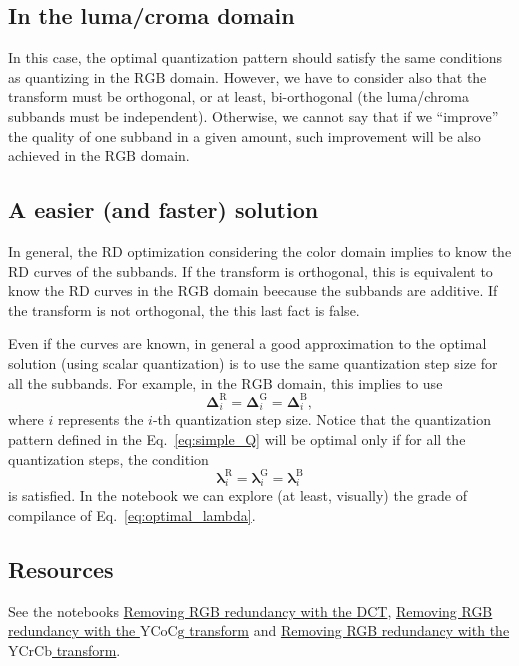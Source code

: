 \subsection{In the luma/croma domain}

In this case, the optimal quantization pattern should satisfy the same
conditions as quantizing in the $\text{RGB}$ domain. However, we have
to consider also that the transform must be orthogonal, or at least,
bi-orthogonal (the luma/chroma subbands must be
independent). Otherwise, we cannot say that if we ``improve'' the
quality of one subband in a given amount, such improvement will be
also achieved in the $\text{RGB}$ domain.

\subsection{A easier (and faster) solution}

In general, the RD optimization considering the color domain implies
to know the RD curves of the subbands. If the transform is orthogonal,
this is equivalent to know the RD curves in the $\text{RGB}$ domain
beecause the subbands are additive. If the transform is not
orthogonal, the this last fact is false.

Even if the curves are known, in general a good approximation to the
optimal solution (using scalar quantization) is to use the same
quantization step size for all the subbands. For example, in the
$\text{RGB}$ domain, this implies to use
\begin{equation}
  \mathbf{\Delta}^{\text{R}}_i = \mathbf{\Delta}^{\text{G}}_i =
  \mathbf{\Delta}^{\text{B}}_i,
  \label{eq:simple_Q}
\end{equation}
where $i$ represents the $i$-th quantization step size. Notice that
the quantization pattern defined in the Eq.~\eqref{eq:simple_Q} will
be optimal only if for all the quantization steps, the condition
\begin{equation}
  \mathbf{\lambda}^{\text{R}}_i = \mathbf{\lambda}^{\text{G}}_i =
  \mathbf{\lambda}^{\text{B}}_i
  \label{eq:optimal_lambda}
\end{equation}
is satisfied. In the notebook
\href{https://github.com/Sistemas-Multimedia/Sistemas-Multimedia.github.io/blob/master/contents/RGB_SQ/RGB_SQ.ipynb}{}
we can explore (at least, visually) the grade of compilance of
Eq.~\eqref{eq:optimal_lambda}.

\subsection*{Resources}
See the notebooks
\href{https://github.com/vicente-gonzalez-ruiz/color_transforms/blob/main/docs/3DCT/3DCT_over_RGB.ipynb}{Removing
  RGB redundancy with the DCT},
\href{https://github.com/vicente-gonzalez-ruiz/color_transforms/blob/main/docs/YCoCg/YCoCg_over_RGB.ipynb}{Removing
  RGB redundancy with the $\text{YCoCg}$ transform} and
\href{https://github.com/vicente-gonzalez-ruiz/color_transforms/blob/main/docs/YCrCb/YCrCb_over_RGB.ipynb}{Removing
  RGB redundancy with the $\text{YCrCb}$ transform}.

